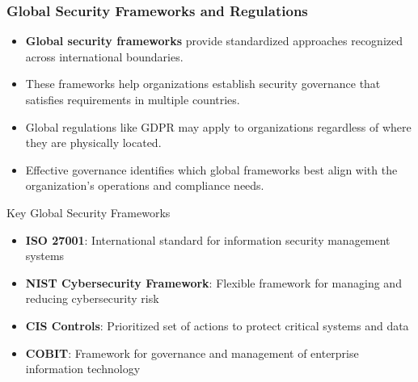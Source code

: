 \documentclass{beamer}
\begin{document}
\begin{frame}
\frametitle{Global Security Frameworks and Regulations}
\begin{itemize}
\item \textbf{Global security frameworks} provide standardized approaches recognized across international boundaries.
\item These frameworks help organizations establish security governance that satisfies requirements in multiple countries.
\item Global regulations like GDPR may apply to organizations regardless of where they are physically located.
\item Effective governance identifies which global frameworks best align with the organization's operations and compliance needs.
\end{itemize}

\begin{block}{Key Global Security Frameworks}
    \scriptsize
\begin{itemize}
\item \textbf{ISO 27001}: International standard for information security management systems
\item \textbf{NIST Cybersecurity Framework}: Flexible framework for managing and reducing cybersecurity risk
\item \textbf{CIS Controls}: Prioritized set of actions to protect critical systems and data
\item \textbf{COBIT}: Framework for governance and management of enterprise information technology
\end{itemize}
\end{block}
\end{frame}
\end{document}

